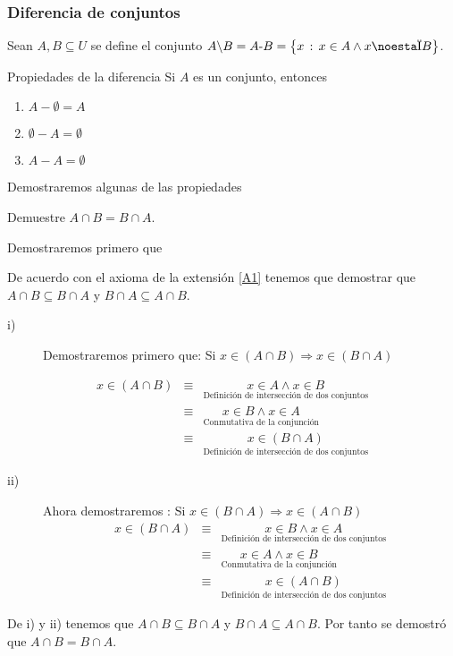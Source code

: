 \subsubsection{Diferencia de conjuntos}

Sean $A,B\subseteq U$ se define el conjunto $A\backslash B=A\text{-\ensuremath{B=\left\{ x\,:\,x\in A\wedge x\notin B\right\} }}$.

\newcommand{\dif}{\backslash}
\begin{teo}{Propiedades de la diferencia}{} Si $A$ es un conjunto, entonces  
\begin{enumerate} 
\item $A-\emptyset = A$ 
\item $\emptyset- A= \emptyset$    
\item $A- A=\emptyset$ 
\end{enumerate} 
\end{teo}

Demostraremos algunas de las propiedades

\prop  Demuestre $A\cap B=B\cap A.$

\begin{prueba}Demostraremos primero que

De acuerdo con el axioma de la extensión \ref{A1} tenemos que demostrar
que $A\cap B\subseteq B\cap A$ y $B\cap A\subseteq A\cap B.$
\begin{description}
\item [{i)}] Demostraremos primero que: Si $x\in\left(A\cap B\right)\Rightarrow x\in\left(B\cap A\right)$
\end{description}
\begin{eqnarray*}
x\in\left(A\cap B\right) & \equiv & \underset{\mbox{Definición de intersección de dos conjuntos}}{x\in A\wedge x\in B}\\
 & \equiv & \underset{\mbox{Conmutativa de la conjunción}}{x\in B\wedge x\in A}\\
 & \equiv & \underset{\mbox{Definición de intersección de dos conjuntos}}{x\in\left(B\cap A\right)}
\end{eqnarray*}

\begin{description}
\item [{ii)}] Ahora demostraremos : Si $x\in\left(B\cap A\right)\Rightarrow x\in\left(A\cap B\right)$
\begin{eqnarray*}
x\in\left(B\cap A\right) & \equiv & \underset{\mbox{Definición de intersección de dos conjuntos}}{x\in B\wedge x\in A}\\
 & \equiv & \underset{\mbox{Conmutativa de la conjunción}}{x\in A\wedge x\in B}\\
 & \equiv & \underset{\mbox{Definición de intersección de dos conjuntos}}{x\in\left(A\cap B\right)}
\end{eqnarray*}
\end{description}
De i) y ii) tenemos que $A\cap B\subseteq B\cap A$ y $B\cap A\subseteq A\cap B.$
Por tanto se demostró que $A\cap B=B\cap A.$

\end{prueba}

